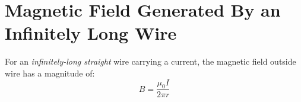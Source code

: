 \section{Magnetic Field Generated By an Infinitely Long Wire}
%  
%    
For an \emph{infinitely-long straight} wire carrying a current, the magnetic
field outside wire has a magnitude of:
\begin{equation}
  \boxed{
    B=\frac{\mu_0I}{2\pi r}
  }
\end{equation}
%  
%
%
%
%
%  
%    
%  
%
%
%
